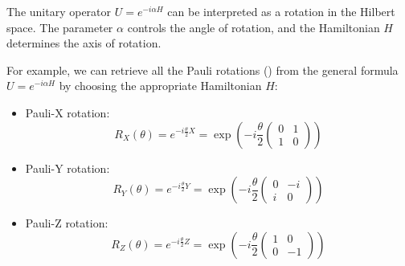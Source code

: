 \highspace
\begin{examplebox}
    The unitary operator $U = e^{-i \alpha H}$ can be interpreted as a rotation in the Hilbert space. The parameter $\alpha$ controls the angle of rotation, and the Hamiltonian $H$ determines the axis of rotation.

    \highspace
    For example, we can retrieve all the Pauli rotations () from the general formula $U = e^{-i \alpha H}$ by choosing the appropriate Hamiltonian $H$:
    \begin{itemize}
        \item Pauli-X rotation:
        \begin{equation*}
            R_X(\theta) = e^{-i \frac{\theta}{2} X} = \exp\left(-i \frac{\theta}{2} \begin{pmatrix}
                0 & 1 \\
                1 & 0
            \end{pmatrix}\right)
        \end{equation*}
        \item Pauli-Y rotation:
        \begin{equation*}
            R_Y(\theta) = e^{-i \frac{\theta}{2} Y} = \exp\left(-i \frac{\theta}{2} \begin{pmatrix}
                0 & -i \\
                i & 0
            \end{pmatrix}\right)
        \end{equation*}
        \item Pauli-Z rotation:
        \begin{equation*}
            R_Z(\theta) = e^{-i \frac{\theta}{2} Z} = \exp\left(-i \frac{\theta}{2} \begin{pmatrix}
                1 & 0 \\
                0 & -1
            \end{pmatrix}\right)
        \end{equation*}
    \end{itemize}
\end{examplebox}